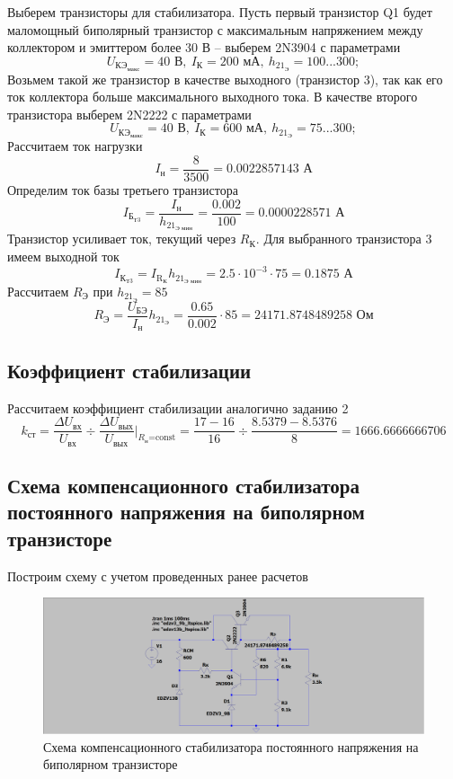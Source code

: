 \documentclass[a4paper, 12pt]{article}
\begin{document}
    Выберем транзисторы для стабилизатора. Пусть первый транзистор Q1 будет
    маломощный биполярный транзистор с максимальным напряжением между коллектором и эмиттером более 30 В -- выберем 2N3904 с параметрами
    $$
    U_{\text{КЭ}_\text{макс}}=40\text{ В},\ I_\text{К}=200\text{ мА},\ h_{21_\text{Э}}=100...300;
    $$
    Возьмем такой же транзистор в качестве выходного (транзистор 3), так как его ток коллектора больше максимального выходного тока. В качестве второго транзистора
    выберем 2N2222 с параметрами
    $$
    U_{\text{КЭ}_\text{макс}}=40\text{ В},\ I_\text{К}=600\text{ мА},\ h_{21_\text{Э}}=75...300;
    $$
    Рассчитаем ток нагрузки
    $$
    I_\text{н}=\dfrac{8}{3500}=0.0022857143\text{ А}
    $$
    Определим ток базы третьего транзистора
    $$
    I_{\text{Б}_\text{Т3}}=\dfrac{I_\text{н}}{h_{21_\text{Э мин}}}=\dfrac{0.002}{100}=0.0000228571\text{ А}
    $$
    Транзистор усиливает ток, текущий через $R_\text{К}$. Для выбранного транзистора 3 имеем выходной ток
    $$
    I_{\text{К}_\text{Т3}}=I_{\text{R}_\text{К}}h_{21_\text{Э мин}}=2.5\cdot10^{-3}\cdot75=0.1875\text{ А}
    $$
    Рассчитаем $R_\text{Э}$ при $h_{21_\text{Э}}=85$
    $$
    R_\text{Э}=\dfrac{U_\text{БЭ}}{I_\text{н}}h_{21_\text{Э}}=\dfrac{0.65}{0.002}\cdot85=24171.8748489258\text{ Ом}
    $$


    \subsection{Коэффициент стабилизации}
    Рассчитаем коэффициент стабилизации аналогично заданию 2
    $$
    k_{\text{ст}}=\dfrac{\Delta U_{\text{вх}}}{U_{\text{вх}}}\div\dfrac{\Delta U_{\text{вых}}}{U_{\text{вых}}}\bigg|_{R_\text{н}\text{=const}}=\dfrac{17-16}{16}\div\dfrac{8.5379-8.5376}{8}=1666.6666666706
    $$


    \subsection{Схема компенсационного стабилизатора постоянного напряжения на биполярном транзисторе}
    Построим схему с учетом проведенных ранее расчетов
    \begin{figure}[H]
        \centering
        \includegraphics[scale=0.22]{3task_scheme_A.png}
        \captionsetup{skip=0pt}
        \caption{Схема компенсационного стабилизатора постоянного напряжения на биполярном транзисторе}
        \label{fig:3task_scheme_A}
    \end{figure}
\end{document}
